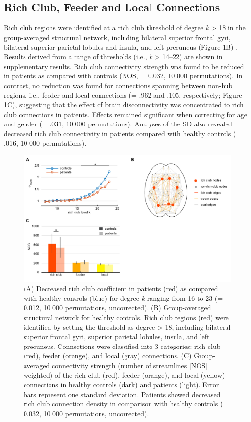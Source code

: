 \begin{refsection}
\subsection*{Rich Club, Feeder and Local Connections}
Rich club regions were identified at a rich club threshold of degree \textit{k} > 18 in the group-averaged structural network, including bilateral superior frontal gyri, bilateral superior parietal lobules and insula, and left precuneus (Figure \ref{rcsczFig1}B) \citep{vanDenHeuvel2011RichclubOO,vanDenHeuvel2013AbnormalRC}. Results derived from a range of thresholds (i.e., \textit{k} > 14–22) are shown in supplementary results. Rich club connectivity strength was found to be reduced in patients as compared with controls (NOS, \pval = 0.032, 10 000 permutations). In contrast, no reduction was found for connections spanning between non-hub regions, i.e., feeder and local connections (\pval = .962 and .105, respectively; Figure \ref{rcsczFig1}C), suggesting that the effect of brain disconnectivity was concentrated to rich club connections in patients. Effects remained significant when correcting for age and gender (\pval = .031, 10 000 permutations). Analyses of the SD also revealed decreased rich club connectivity in patients compared with healthy controls (\pval = .016, 10 000 permutations).

\begin{figure}[h]
\centering
  \includegraphics[width=\linewidth]{images/rcsczFig1.jpg}
  \caption{(A) Decreased rich club coefficient in patients (red) as compared with healthy controls (blue) for degree \textit{k} ranging from 16 to 23 (\pval = 0.012, 10 000 permutations, uncorrected). (B) Group-averaged structural network for healthy controls. Rich club regions (red) were identified by setting the threshold as degree > 18, including bilateral superior frontal gyri, superior parietal lobules, insula, and left precuneus. Connections were classified into 3 categories: rich club (red), feeder (orange), and local (gray) connections. (C) Group-averaged connectivity strength (number of streamlines [NOS] weighted) of the rich club (red), feeder (orange), and local (yellow) connections in healthy controls (dark) and patients (light). Error bars represent one standard deviation. Patients showed decreased rich club connection density in comparison with healthy controls (\pval = 0.032, 10 000 permutations, uncorrected).
}
  \label{rcsczFig1}
\end{figure}


\end{refsection}
